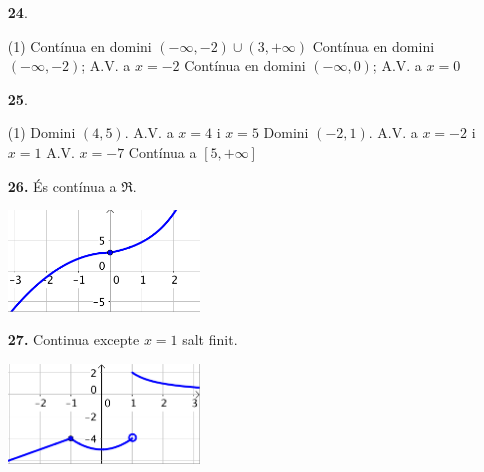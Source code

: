 \documentclass[a4paper, pdf, twoside]{book}
\begin{document}
\begin{multicols}{2}
\begin{enumerate}

 \item[\fontfamily{phv}\selectfont\color{blue}\textbf{24}. ] 
 \begin{tasks}[column-sep=1em, item-indent=1.3333em](1)
	 \task* Contínua en domini $(-\infty ,-2)\cup (3,+\infty )$
	 \task* Contínua en domini $(-\infty ,-2)$; A.V. a $x=-2$
	 \task* Contínua en domini $(-\infty ,0)$; A.V. a $x=0$
\end{tasks}
\vspace{0.25cm}



 \item[\fontfamily{phv}\selectfont\color{blue}\textbf{25}. ] 
 \begin{tasks}[column-sep=1em, item-indent=1.3333em](1)
	 \task* Domini $(4,5)$. A.V. a $x=4$ i $x=5$
	 \task* Domini $(-2,1)$. A.V. a $x=-2$ i $x=1$
	 \task A.V. $x=-7$
	 \task Contínua a $[5,+\infty ]$
\end{tasks}
\vspace{0.25cm}
\item[\fontfamily{phv}\selectfont\color{blue}\textbf{26. }] 
És contínua a $\Re $.\par \includegraphics [width=0.4\textwidth ]{img-sol/t6-28}
\vspace{0.25cm}
\item[\fontfamily{phv}\selectfont\color{blue}\textbf{27. }] 
Continua excepte $x=1$ salt finit.\par \includegraphics [width=0.4\textwidth ]{img-sol/t6-29}
 \end{enumerate}
\vspace{0.3cm}



\end{multicols}
\end{document}
